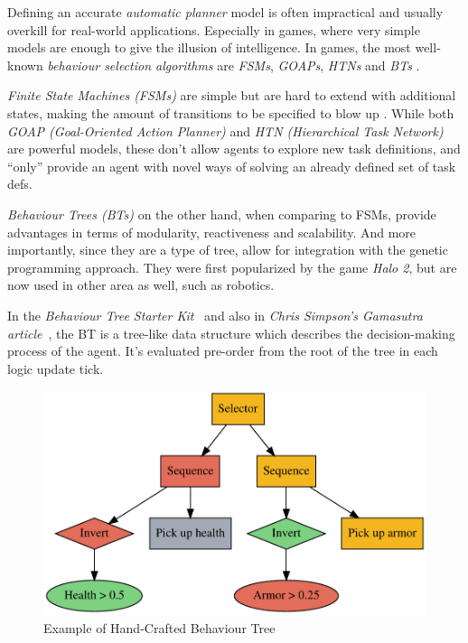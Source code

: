\documentclass[a4paper, twocolumn]{article}
\begin{document}
        Defining an accurate \emph{automatic planner} model is often impractical and usually overkill for real-world applications. Especially in games, where very simple models are enough to give the illusion of intelligence. In games, the most well-known \emph{behaviour selection algorithms} are \emph{FSMs}, \emph{GOAPs}, \emph{HTNs} and \emph{BTs} \cite{dawe2014overview}.

        \emph{Finite State Machines (FSMs)} are simple but are hard to extend with additional states, making the amount of transitions to be specified to blow up \cite{dawe2014overview}. While both \emph{GOAP (Goal-Oriented Action Planner)} and \emph{HTN (Hierarchical Task Network)} are powerful models, these don't allow agents to explore new task definitions, and ``only'' provide an agent with novel ways of solving an already defined set of task defs.

        \emph{Behaviour Trees (BTs)} on the other hand, when comparing to FSMs, provide advantages in terms of modularity, reactiveness and scalability. And more importantly, since they are a type of tree, allow for integration with the genetic programming approach. They were first popularized by the game \emph{Halo 2}, but are now used in other area as well, such as robotics.

        In the \emph{Behaviour Tree Starter Kit}~\cite{champandard2014behaviour} and also in \emph{Chris Simpson's Gamasutra article}~\cite{simpson2014behavior}, the BT is a tree-like data structure which describes the decision-making process of the agent. It's evaluated pre-order from the root of the tree in each logic update tick.

        \begin{figure}[H]
            \centering
            \includegraphics[width=\linewidth]{share/behaviour_tree.pdf}
            \caption{Example of Hand-Crafted Behaviour Tree}
            \label{fig:behaviour_tree}
        \end{figure}
\end{document}
